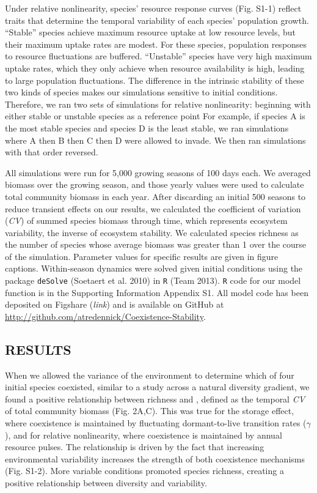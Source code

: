 \documentclass[12pt,]{article}
\begin{document}
Under relative nonlinearity, species' resource response curves (Fig.
S1-1) reflect traits that determine the temporal variability of each
species' population growth. ``Stable'' species achieve maximum resource
uptake at low resource levels, but their maximum uptake rates are
modest. For these species, population responses to resource fluctuations
are buffered. ``Unstable'' species have very high maximum uptake rates,
which they only achieve when resource availability is high, leading to
large population fluctuations. The difference in the intrinsic stability
of these two kinds of species makes our simulations sensitive to initial
conditions. Therefore, we ran two sets of simulations for relative
nonlinearity: beginning with either stable or unstable species as a
reference point For example, if species A is the most stable species and
species D is the least stable, we ran simulations where A then B then C
then D were allowed to invade. We then ran simulations with that order
reversed.

All simulations were run for 5,000 growing seasons of 100 days each. We
averaged biomass over the growing season, and those yearly values were
used to calculate total community biomass in each year. After discarding
an initial 500 seasons to reduce transient effects on our results, we
calculated the coefficient of variation (\emph{CV}) of summed species
biomass through time, which represents ecosystem variability, the
inverse of ecosystem stability. We calculated species richness as the
number of species whose average biomass was greater than 1 over the
course of the simulation. Parameter values for specific results are
given in figure captions. Within-season dynamics were solved given
initial conditions using the package \texttt{deSolve} (Soetaert et al.
2010) in \texttt{R} (Team 2013). \texttt{R} code for our model function
is in the Supporting Information Appendix S1. All model code has been
deposited on Figshare (\emph{link}) and is available on GitHub at
\url{http://github.com/atredennick/Coexistence-Stability}.

\subsection{RESULTS}\label{results}

When we allowed the variance of the environment to determine which of
four initial species coexisted, similar to a study across a natural
diversity gradient, we found a positive relationship between richness
and , defined as the temporal \emph{CV} of
total community biomass (Fig. 2A,C). This was true for the storage
effect, where coexistence is maintained by fluctuating dormant-to-live
transition rates (\(\gamma\)), and for relative nonlinearity, where
coexistence is maintained by annual resource pulses. The relationship is
driven by the fact that increasing environmental variability increases
the strength of both coexistence mechanisms (Fig. S1-2). More variable
conditions promoted species richness, creating a positive relationship
between diversity and  variability.
\end{document}
